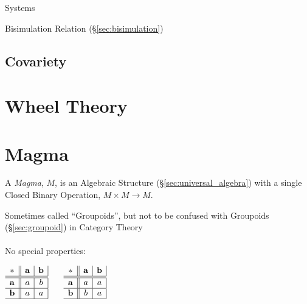 \cite{rutten00}

Systems

Bisimulation Relation (\S\ref{sec:bisimulation})



\subsection{Covariety}\label{sec:covariety}

\section{Wheel Theory}\label{sec:wheel_theory}




\section{Magma}\label{sec:magma}

A \emph{Magma}, $M$, is an Algebraic Structure
(\S\ref{sec:universal_algebra}) with a single Closed Binary Operation,
$M \times M \rightarrow M$.

\fist Sometimes called ``Groupoids'', but not to be confused with Groupoids
(\S\ref{sec:groupoid}) in Category Theory
\\ \\
No special properties:

$\begin{array}{c||c|c|}
  * & \mathbf{a} & \mathbf{b} \\ \hline \hline
  \mathbf{a} & a & b \\ \hline
  \mathbf{b} & a & a \\ \hline
\end{array}$ $\quad$ $\begin{array}{c||c|c|}
  * & \mathbf{a} & \mathbf{b} \\ \hline \hline
  \mathbf{a} & a & a \\ \hline
  \mathbf{b} & b & a \\ \hline
\end{array}$ \\ \hfill \\

